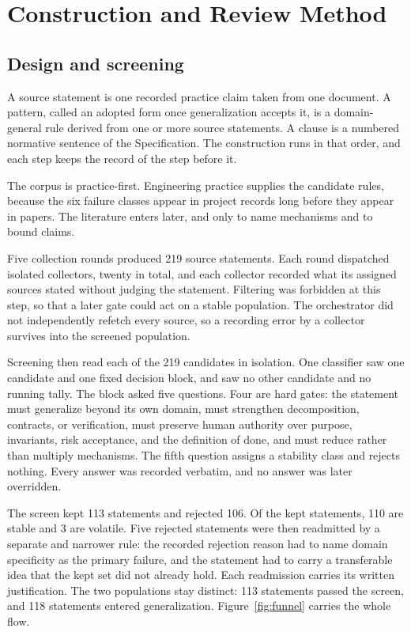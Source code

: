 \section{Construction and Review Method}\label{sec:method}

\subsection{Design and screening}

A source statement is one recorded practice claim taken from one document. A pattern, called an adopted form once generalization accepts it, is a domain-general rule derived from one or more source statements. A clause is a numbered normative sentence of the Specification. The construction runs in that order, and each step keeps the record of the step before it.

The corpus is practice-first. Engineering practice supplies the candidate rules, because the six failure classes appear in project records long before they appear in papers. The literature enters later, and only to name mechanisms and to bound claims.

Five collection rounds produced 219 source statements. Each round dispatched isolated collectors, twenty in total, and each collector recorded what its assigned sources stated without judging the statement. Filtering was forbidden at this step, so that a later gate could act on a stable population. The orchestrator did not independently refetch every source, so a recording error by a collector survives into the screened population.

Screening then read each of the 219 candidates in isolation. One classifier saw one candidate and one fixed decision block, and saw no other candidate and no running tally. The block asked five questions. Four are hard gates: the statement must generalize beyond its own domain, must strengthen decomposition, contracts, or verification, must preserve human authority over purpose, invariants, risk acceptance, and the definition of done, and must reduce rather than multiply mechanisms. The fifth question assigns a stability class and rejects nothing. Every answer was recorded verbatim, and no answer was later overridden.

The screen kept 113 statements and rejected 106. Of the kept statements, 110 are stable and 3 are volatile. Five rejected statements were then readmitted by a separate and narrower rule: the recorded rejection reason had to name domain specificity as the primary failure, and the statement had to carry a transferable idea that the kept set did not already hold. Each readmission carries its written justification. The two populations stay distinct: 113 statements passed the screen, and 118 statements entered generalization. Figure~\ref{fig:funnel} carries the whole flow.

